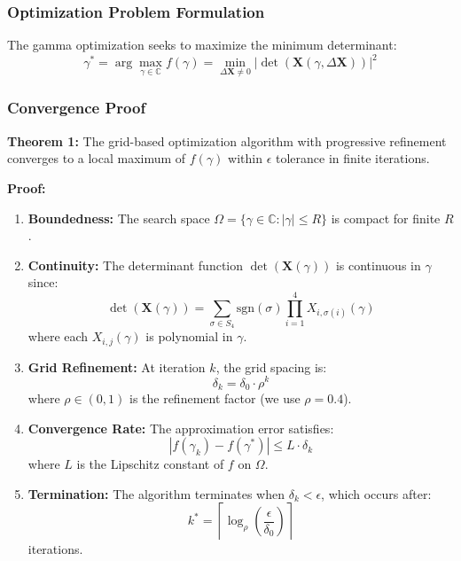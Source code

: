 \subsubsection{Optimization Problem Formulation}
The gamma optimization seeks to maximize the minimum determinant:
\begin{equation}
\gamma^* = \arg \max_{\gamma \in \mathbb{C}} f(\gamma) = \min_{\Delta\mathbf{X} \neq 0} |\det(\mathbf{X}(\gamma, \Delta\mathbf{X}))|^2
\end{equation}

\subsubsection{Convergence Proof}
\textbf{Theorem 1:} The grid-based optimization algorithm with progressive refinement converges to a local maximum of $f(\gamma)$ within $\epsilon$ tolerance in finite iterations.

\textbf{Proof:} 
\begin{enumerate}
    \item \textbf{Boundedness:} The search space $\Omega = \{\gamma \in \mathbb{C} : |\gamma| \leq R\}$ is compact for finite $R$.
    
    \item \textbf{Continuity:} The determinant function $\det(\mathbf{X}(\gamma))$ is continuous in $\gamma$ since:
    \begin{equation}
    \det(\mathbf{X}(\gamma)) = \sum_{\sigma \in S_4} \text{sgn}(\sigma) \prod_{i=1}^{4} X_{i,\sigma(i)}(\gamma)
    \end{equation}
    where each $X_{i,j}(\gamma)$ is polynomial in $\gamma$.
    
    \item \textbf{Grid Refinement:} At iteration $k$, the grid spacing is:
    \begin{equation}
    \delta_k = \delta_0 \cdot \rho^k
    \end{equation}
    where $\rho \in (0,1)$ is the refinement factor (we use $\rho = 0.4$).
    
    \item \textbf{Convergence Rate:} The approximation error satisfies:
    \begin{equation}
    |f(\gamma_k) - f(\gamma^*)| \leq L \cdot \delta_k
    \end{equation}
    where $L$ is the Lipschitz constant of $f$ on $\Omega$.
    
    \item \textbf{Termination:} The algorithm terminates when $\delta_k < \epsilon$, which occurs after:
    \begin{equation}
    k^* = \left\lceil \log_{\rho}\left(\frac{\epsilon}{\delta_0}\right) \right\rceil
    \end{equation}
    iterations.
\end{enumerate}

